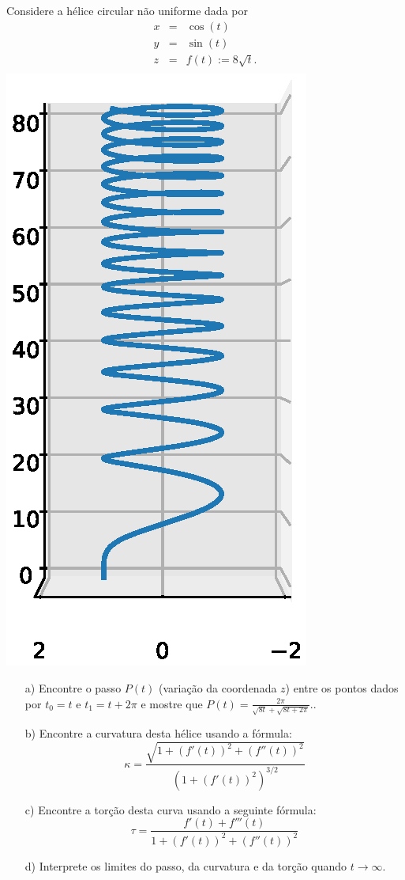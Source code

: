 \begin{exeresol}  Considere a hélice circular não uniforme dada por
  \begin{eqnarray*}
    x&=&\cos(t)\\
    y&=&\sin(t)\\
    z&=&f(t):=8\sqrt{t}.\\
  \end{eqnarray*}
  \includegraphics[scale=.6]{./cap_curvas/figs/helice_sqrt_z}
  \begin{itemize}
    \item[a)] Encontre o passo $P(t)$ (variação da coordenada $z$) entre os pontos dados por $t_0=t$ e $t_1=t+2\pi$ e mostre que $P(t)=\frac{2\pi}{\sqrt{8t} + \sqrt{8t+2\pi}}.$.
  \item[b)] Encontre  a curvatura desta hélice usando a fórmula:
  $$\kappa=\frac{\sqrt{1+\left(f'(t)\right)^2+\left(f''(t)\right)^2}}{\left({1+\left(f'(t)\right)^2}\right)^{3/2}}$$
    \item[c)] Encontre a torção desta curva usando a seguinte fórmula:
    $$\tau=\frac{f'(t)+f'''(t)}{1+\left(f'(t)\right)^2+\left(f''(t)\right)^2}$$
    \item[d)] Interprete os limites do passo, da curvatura e da torção quando $t\to \infty$.
    \end{itemize}
  \end{exeresol}
